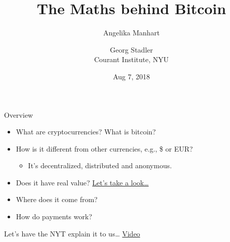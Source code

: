 \documentclass[12pt]{beamer}
\title{{\bf The Maths behind Bitcoin }}
\date{Aug 7, 2018}
\author{Angelika Manhart \and Georg Stadler \\ Courant Institute, NYU}
\theoremstyle{definition}
\numberwithin{equation}{section}
\begin{document}
\begin{frame}
\maketitle
\end{frame}


\begin{frame}{Overview}
  \begin{itemize}
  \item What are cryptocurrencies? What is bitcoin?\\[3ex]
    \pause
  \item How is it different from other currencies, e.g., \$ or EUR? \\[1ex]
    \pause
    \begin{itemize}
      \item It's decentralized, distributed and anonymous.\\[1ex]
    \end{itemize}
    \pause
  \item Does it have real value?
    \href{https://www.coindesk.com/price/}{Let's take a look\ldots}\\[3ex]
    \pause
  \item Where does it come from?\\[3ex]
    \pause
  \item How do payments work?
  \end{itemize}
\end{frame}


\begin{frame}{Let's have the NYT explain it to us\ldots}
\centering
  \href{https://www.nytimes.com/video/business/100000005675385/baffled-by-bitcoin-heres-how-cryptocurrency-works.html?smid=pl-share}{\Large
    Video}\\[3ex]  
\end{frame}
\end{document}
